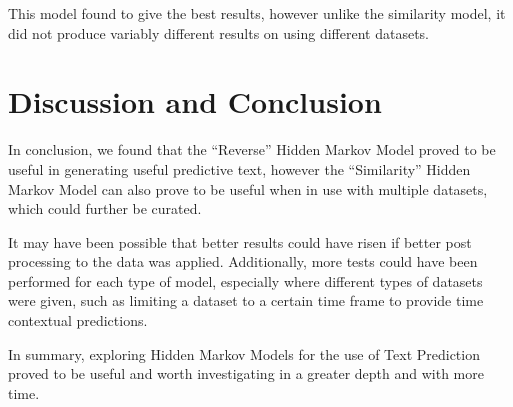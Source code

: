 \documentclass{article}
\begin{document}
This model found to give the best results, however unlike the similarity model,
it did not produce variably different results on using different datasets.

\section{Discussion and Conclusion}
In conclusion, we found that the ``Reverse'' Hidden Markov Model proved to be
useful in generating useful predictive text, however the ``Similarity'' Hidden
Markov Model can also prove to be useful when in use with multiple datasets,
which could further be curated.

It may have been possible that better results could have risen if better post
processing to the data was applied. Additionally, more tests could have been
performed for each type of model, especially where different types of datasets
were given, such as limiting a dataset to a certain time frame to provide time
contextual predictions.

In summary, exploring Hidden Markov Models for the use of Text Prediction proved to be useful and worth investigating in a greater depth and with more time.
\end{document}
